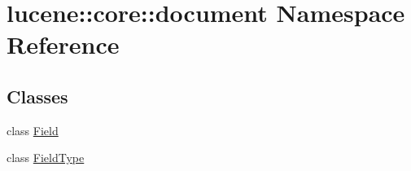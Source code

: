 \hypertarget{namespacelucene_1_1core_1_1document}{}\section{lucene\+:\+:core\+:\+:document Namespace Reference}
\label{namespacelucene_1_1core_1_1document}
\subsection*{Classes}
\begin{DoxyCompactItemize}
\item 
class \mbox{\hyperlink{classlucene_1_1core_1_1document_1_1Field}{Field}}
\item 
class \mbox{\hyperlink{classlucene_1_1core_1_1document_1_1FieldType}{Field\+Type}}
\end{DoxyCompactItemize}
